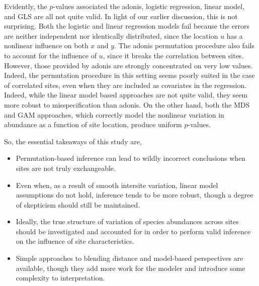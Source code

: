 \documentclass{article}
\begin{document}
Evidently, the $p$-values associated the adonis, logistic regression, linear
model, and GLS are all not quite valid. In light of our earlier discussion, this
is not surprising. Both the logistic and linear regression models fail because
the errors are neither independent nor identically distributed, since the
location $u$ has a nonlinear influence on both $x$ and $y$. The adonis
permutation procedure also fails to account for the influence of $u$, since it
breaks the correlation between sites. However, those provided by adonis are
strongly concentrated on very low values. Indeed, the permutation procedure in
this setting seems poorly suited in the case of correlated sites, even when they
are included as covariates in the regression. Indeed, while the linear model
based approaches are not quite valid, they seem more robust to misspecification
than adonis. On the other hand, both the MDS and GAM approaches, which correctly
model the nonlinear variation in abundance as a function of site location,
produce uniform $p$-values.

So, the essential takeaways of this study are,
\begin{itemize}
\item Permutation-based inference can lead to wildly incorrect conclusions when
  sites are not truly exchangeable.
\item Even when, as a result of smooth intersite variation, linear model
  assumptions do not hold, inference tends to be more robust, though a degree of
  skepticism should still be maintained.
\item Ideally, the true structure of variation of species abundances across
  sites should be investigated and accounted for in order to perform valid
  inference on the influence of site characteristics.
\item Simple approaches to blending distance and model-based perspectives are
  available, though they add more work for the modeler and introduce some
  complexity to interpretation.
\end{itemize}



\end{document}
